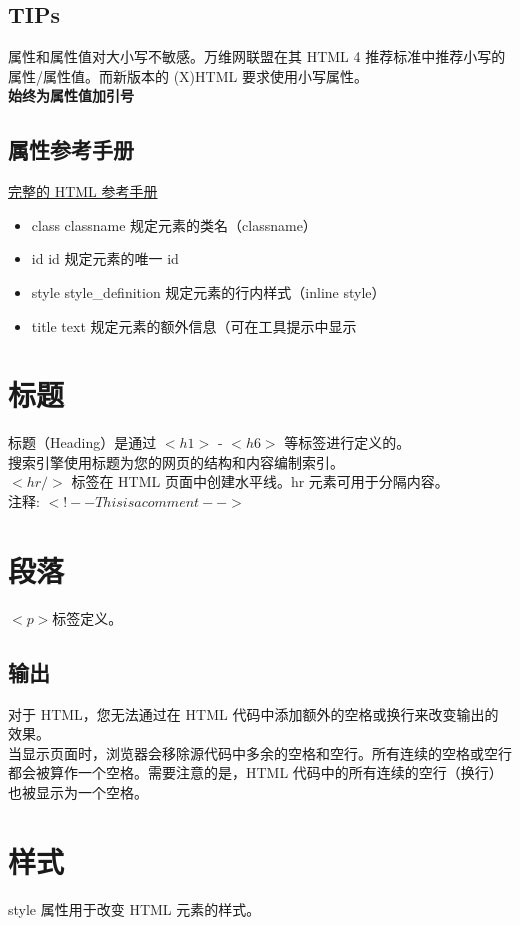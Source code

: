 \documentclass[10pt,UTF8]{ctexart}
\begin{document}
\subsection{TIPs}
属性和属性值对大小写不敏感。万维网联盟在其 HTML 4 推荐标准中推荐小写的属性/属性值。而新版本的 (X)HTML 要求使用小写属性。\\
\textbf{始终为属性值加引号}

\subsection{属性参考手册}
\noindent \href{http://www.w3school.com.cn/tags/index.asp}{完整的 HTML 参考手册}
\begin{itemize}
\item class classname 规定元素的类名（classname） 
\item id id 规定元素的唯一 id
\item style style\_definition 规定元素的行内样式（inline style）
\item title text 规定元素的额外信息（可在工具提示中显示
\end{itemize}
\section{标题}
\noindent 标题（Heading）是通过 $<h1>$ - $<h6>$ 等标签进行定义的。\\
搜索引擎使用标题为您的网页的结构和内容编制索引。\\
$<hr />$ 标签在 HTML 页面中创建水平线。hr 元素可用于分隔内容。\\
注释: $<!-- This is a comment -->$

\section{段落}
$<p>$标签定义。
\subsection{输出}
对于 HTML，您无法通过在 HTML 代码中添加额外的空格或换行来改变输出的效果。\\
当显示页面时，浏览器会移除源代码中多余的空格和空行。所有连续的空格或空行都会被算作一个空格。需要注意的是，HTML 代码中的所有连续的空行（换行）也被显示为一个空格。

\section{样式}
style 属性用于改变 HTML 元素的样式。
\end{document}
